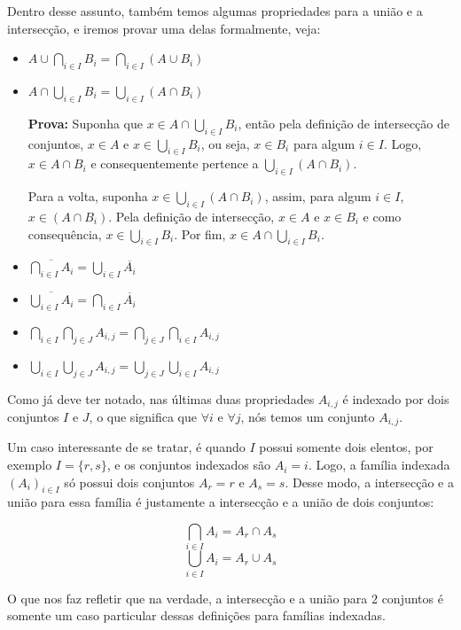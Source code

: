 Dentro desse assunto, também temos algumas propriedades para a união e a intersecção, e iremos provar uma delas formalmente, veja:

\begin{itemize}
  \item $A \cup \bigcap_{i \in I} B_i = \bigcap_{i \in I} (A \cup B_i)$
  \item $A \cap \bigcup_{i \in I} B_i = \bigcup_{i \in I} (A \cap B_i)$
  
  \textbf{Prova:} Suponha que $x \in A \cap \bigcup_{i \in I} B_i$, então pela definição de intersecção de conjuntos, $x \in A$ e $x \in \bigcup_{i \in I} B_i$, ou seja, $x \in B_i$ para algum $i \in I$. Logo, $x \in A \cap B_i$ e consequentemente pertence a $\bigcup_{i \in I}(A \cap B_i)$.
  
  Para a volta, suponha $x \in \bigcup_{i \in I} (A \cap B_i)$, assim, para algum $i \in I$, $x \in (A \cap B_i)$. Pela definição de intersecção, $x \in A$ e $x \in B_i$ e como consequência, $x \in \bigcup_{i \in I} B_i$. Por fim, $x \in A \cap \bigcup_{i \in I} B_i$.
    
  \item $\overline{\bigcap_{i \in I} A_i} = \bigcup_{i \in I} \overline{A_i}$
  \item $\overline{\bigcup_{i \in I} A_i} = \bigcap_{i \in I} \overline{A_i}$
  \item $\bigcap_{i \in I} \bigcap_{j \in J} A_{i,j} = \bigcap_{j \in J} \bigcap_{i \in I} A_{i,j}$
  \item $\bigcup_{i \in I} \bigcup_{j \in J} A_{i,j} = \bigcup_{j \in J} \bigcup_{i \in I} A_{i,j}$
\end{itemize}

Como já deve ter notado, nas últimas duas propriedades $A_{i,j}$ é indexado por dois conjuntos $I$ e $J$, o que significa que $\forall i$ e $\forall j$, nós temos um conjunto $A_{i,j}$.

Um caso interessante de se tratar, é quando $I$ possui somente dois elentos, por exemplo $I=\{r,s\}$, e os conjuntos indexados são $A_i={i}$. Logo, a família indexada $(A_i)_{i \in I}$ só possui dois conjuntos $A_r={r}$ e $A_s={s}$. Desse modo, a intersecção e a união para essa família é justamente a intersecção e a união de dois conjuntos:

\[\bigcap_{i \in I} A_i = A_r \cap A_s\]
\[\bigcup_{i \in I} A_i = A_r \cup A_s\]

O que nos faz refletir que na verdade, a intersecção e a união para $2$ conjuntos é somente um caso particular dessas definições para famílias indexadas.

